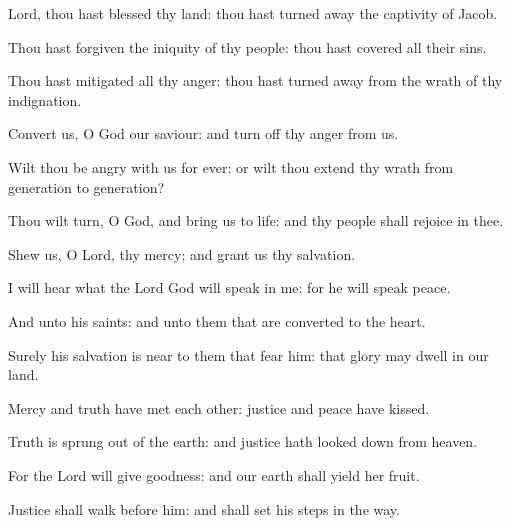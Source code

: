 ﻿\item Lord, thou hast blessed thy land: thou hast turned away the captivity of Jacob.
\item Thou hast forgiven the iniquity of thy people: thou hast covered all their sins.
\item Thou hast mitigated all thy anger: thou hast turned away from the wrath of thy indignation.
\item Convert us, O God our saviour: and turn off thy anger from us.
\item Wilt thou be angry with us for ever: or wilt thou extend thy wrath from generation to generation?
\item Thou wilt turn, O God, and bring us to life: and thy people shall rejoice in thee.
\item Shew us, O Lord, thy mercy; and grant us thy salvation.
\item I will hear what the Lord God will speak in me: for he will speak peace.
\item And unto his saints: and unto them that are converted to the heart.
\item Surely his salvation is near to them that fear him: that glory may dwell in our land.
\item Mercy and truth have met each other: justice and peace have kissed.
\item Truth is sprung out of the earth: and justice hath looked down from heaven.
\item For the Lord will give goodness: and our earth shall yield her fruit.
\item Justice shall walk before him: and shall set his steps in the way.
